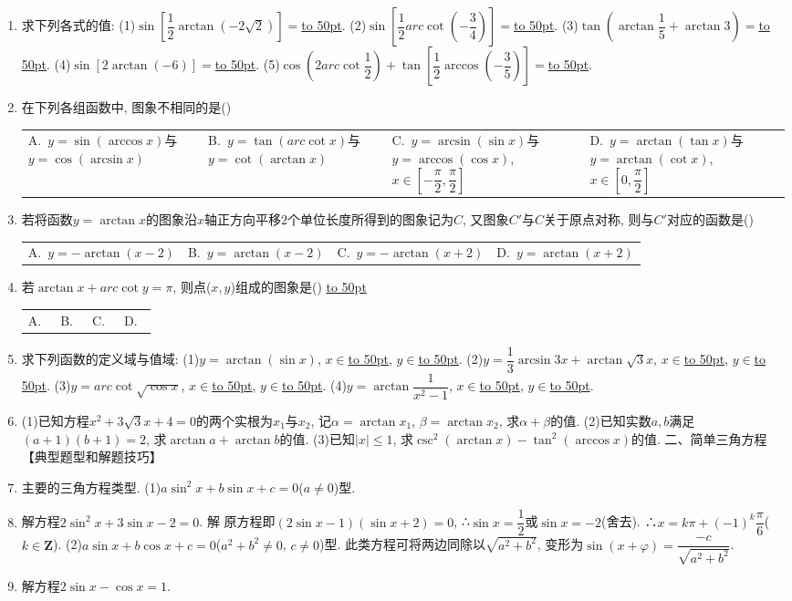 \documentclass[10pt,a4paper]{article}
\newcommand{\blank}[1]{\underline{\hbox to #1pt{}}}
\newcommand{\fourch}[4]{\par\begin{tabular}{p{.23\textwidth}p{.23\textwidth}p{.23\textwidth}p{.23\textwidth}}
A.~#1 &B.~#2& C.~#3& D.~#4
\end{tabular}}
\begin{document}
\begin{enumerate}[1.]
(4)$\arctan \dfrac{1-\tan 25^\circ }{1+\tan 25^\circ }=$\blank{50}.
(5)$\arctan 7+arc\cot \dfrac 34=$\blank{50}.
(6)$\arctan (3+2\sqrt 2)-\arctan \dfrac{\sqrt 2}2=$\blank{50}.
(7)$\arctan \dfrac 12+\arctan \dfrac 15+\arctan \dfrac 18=$\blank{50}.
(8)$\arcsin (\sin 4)+\arccos (\cos 3)+\arctan (\tan 2)+arc\cot (\cot 1)=$\blank{50}.
\item 求下列各式的值:
(1)$\sin [\dfrac 12\arctan (-2\sqrt 2)]=$\blank{50}.
(2)$\sin [\dfrac 12arc\cot (-\dfrac 34)]=$\blank{50}.
(3)$\tan (\arctan \dfrac 15+\arctan 3)=$\blank{50}.
(4)$\sin [2\arctan (-6)]=$\blank{50}.
(5)$\cos (2arc\cot \dfrac 12)+\tan [\dfrac 12\arccos (-\dfrac 35)]=$\blank{50}.
\item 在下列各组函数中, 图象不相同的是()
\fourch{$y=\sin (\arccos x)$与$y=\cos (\arcsin x)$}{$y=\tan (arc\cot x)$与$y=\cot (\arctan x)$}{$y=\arcsin (\sin x)$与$y=\arccos (\cos x)$, $x\in [-\dfrac{\pi }2,\dfrac{\pi }2]$}{$y=\arctan (\tan x)$与$y=\arctan (\cot x)$, $x\in [0,\dfrac{\pi }2]$}
\item 若将函数$y=\arctan x$的图象沿$x$轴正方向平移2个单位长度所得到的图象记为$C$, 又图象$C'$与$C$关于原点对称, 则与$C'$对应的函数是()
\fourch{$y=-\arctan (x-2)$}{$y=\arctan (x-2)$}{$y=-\arctan (x+2)$}{$y=\arctan (x+2)$}
\item 若$\arctan x+arc\cot y=\pi$, 则点($x,y$)组成的图象是()
\blank{50}\fourch{}{}{}{}
\item 求下列函数的定义域与值域:
(1)$y=\arctan (\sin x)$, $x\in$\blank{50}, $y\in$\blank{50}.
(2)$y=\dfrac 13\arcsin 3x+\arctan \sqrt 3x$, $x\in$\blank{50}, $y\in$\blank{50}.
(3)$y=arc\cot \sqrt {\cos x}$, $x\in$\blank{50}, $y\in$\blank{50}.
(4)$y=\arctan \dfrac 1{x^2-1}$, $x\in$\blank{50}, $y\in$\blank{50}.
\item (1)已知方程$x^2+3\sqrt 3x+4=0$的两个实根为$x_1$与$x_2$, 记$\alpha =\arctan x_1$, $\beta =\arctan x_2$, 求$\alpha +\beta$的值.
(2)已知实数$a,b$满足$(a+1)(b+1)=2$, 求$\arctan a+\arctan b$的值.
(3)已知$|x|\le 1$, 求$\csc ^2(\arctan x)-\tan ^2(\arccos x)$的值.
二、简单三角方程
【典型题型和解题技巧】
\item 主要的三角方程类型.
(1)$a\sin ^2x+b\sin x+c=0$($a\ne 0$)型.
\item 解方程$2\sin ^2x+3\sin x-2=0$.
解  原方程即$(2\sin x-1)(\sin x+2)=0$, ∴$\sin x=\dfrac 12$或$\sin x=-2$(舍去).
∴$x=k\pi +(-1)^k\dfrac{\pi }6$($k\in \mathbf{Z}$).
(2)$a\sin x+b\cos x+c=0$($a^2+b^2\ne 0$, $c\ne 0$)型.
此类方程可将两边同除以$\sqrt {a^2+b^2}$, 变形为$\sin (x+\varphi)=\dfrac{-c}{\sqrt {a^2+b^2}}$.
\item 解方程$2\sin x-\cos x=1$.

\end{enumerate}
\end{document}
